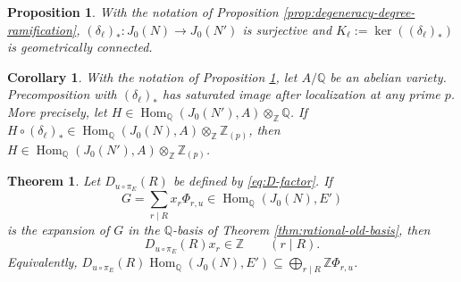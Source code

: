 \documentclass[10pt,a4paper]{amsart}
\newtheorem{theorem}{Theorem}
\newtheorem{proposition}{Proposition}
\newtheorem{corollary}{Corollary}
\newcommand{\Hom}{\operatorname{Hom}}
\newcommand{\Q}{\mathbb Q}
\newcommand{\Z}{\mathbb Z}
\begin{document}
\begin{proposition}\label{prop:connected-degeneracy-kernel}
With the notation of Proposition
\ref{prop:degeneracy-degree-ramification},
\((\delta_\ell)_*:J_0(N)\to J_0(N')\) is surjective and
\(K_\ell:=\ker((\delta_\ell)_*)\) is geometrically
connected.
\end{proposition}

\begin{corollary}\label{cor:connected-local}
With the notation of Proposition \ref{prop:connected-degeneracy-kernel}, let
\(A/\Q\) be an abelian variety. Precomposition with \((\delta_\ell)_*\) has
saturated image after localization at any prime \(p\). More precisely, let
\(H\in\Hom_\Q(J_0(N'),A)\otimes_\Z\Q\). If
\(H\circ(\delta_\ell)_*\in
\Hom_\Q(J_0(N),A)\otimes_\Z\Z_{(p)}\),
then \(H\in\Hom_\Q(J_0(N'),A)\otimes_\Z\Z_{(p)}\).
\end{corollary}

\begin{theorem}\label{thm:denominator}
Let \(D_{u\circ\pi_E}(R)\) be defined by \eqref{eq:D-factor}. If
\[
        G=\sum_{r\mid R}x_r\Phi_{r,u}\in\Hom_\Q(J_0(N),E')
\]
is the expansion of \(G\) in the \(\Q\)-basis of Theorem
\ref{thm:rational-old-basis}, then
\begin{equation}\label{eq:global-denominator}
        D_{u\circ\pi_E}(R)x_r\in\Z
        \qquad(r\mid R).
\end{equation}
Equivalently,
\(D_{u\circ\pi_E}(R)\Hom_\Q(J_0(N),E')\subseteq
\bigoplus_{r\mid R}\Z\Phi_{r,u}\).
\end{theorem}
\end{document}
